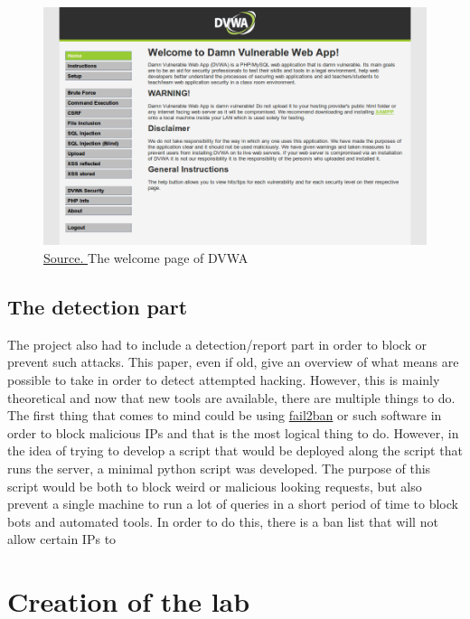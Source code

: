 \documentclass[a4paper,12pt,fleqn]{article}
\begin{document}
\begin{figure}[h]
    \centering
    \includegraphics[scale = 0.45]{images/DVWA.png}
    \caption{\href{https://1.bp.blogspot.com/-UfcDBmOv8yk/WnI1MIxfopI/AAAAAAAAKHU/CDyhAkrVnbQWXWPh0BDr1bxmX8tA_fX0ACLcBGAs/s1600/DVWA.png}{Source. }The welcome page of DVWA}
\end{figure}

\subsection{The detection part}

The project also had to include a detection/report part in order to block or prevent such attacks. This paper\cite{detection}, even if old, give an overview of what means are possible to take in order to detect attempted hacking. However, this is mainly theoretical and now that new tools are available, there are multiple things to do. The first thing that comes to mind could be using \href{https://www.fail2ban.org/wiki/index.php/Main_Page}{fail2ban} or such software in order to block malicious IPs and that is the most logical thing to do. However, in the idea of trying to develop a script that would be deployed along the script that runs the server, a minimal python script was developed. The purpose of this script would be both to block weird or malicious looking requests, but also prevent a single machine to run a lot of queries in a short period of time to block bots and automated tools. In order to do this, there is a ban list that will not allow certain IPs to  

\section{Creation of the lab}
\end{document}
